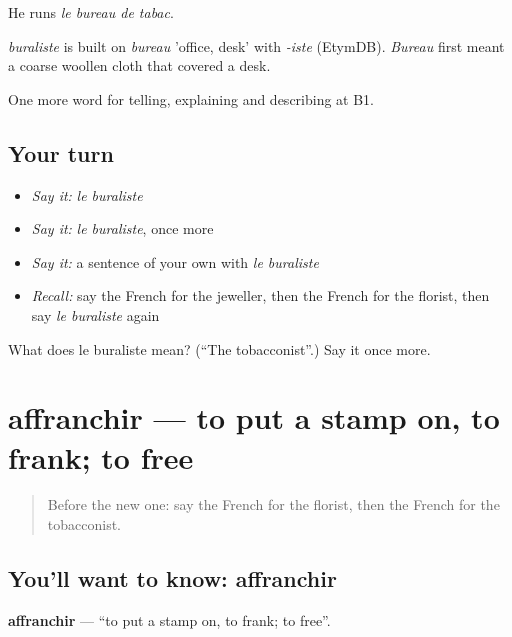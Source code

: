 He runs \emph{le bureau de tabac}.

\begin{cousinweb}
\emph{buraliste} is built on \emph{bureau} 'office, desk' with \emph{-iste} (EtymDB). \emph{Bureau} first meant a coarse woollen cloth that covered a desk.
\end{cousinweb}

\begin{grammarlens}[title={What you've built}]
One more word for telling, explaining and describing at B1.
\end{grammarlens}

\subsection*{Your turn}
\begin{itemize}
\raggedright
  \item \emph{Say it:} \emph{le buraliste}
  \item \emph{Say it:} \emph{le buraliste}, once more
  \item \emph{Say it:} a sentence of your own with \emph{le buraliste}
  \item \emph{Recall:} say the French for the jeweller, then the French for the florist, then say \emph{le buraliste} again
\end{itemize}

\begin{tcolorbox}[breakable,colback=teal!4,colframe=teal!35!black,title={Before you move on}]
What does le buraliste mean? (\textquotedblleft{}The tobacconist\textquotedblright{}.) Say it once more.
\end{tcolorbox}
\section[affranchir]{affranchir — to put a stamp on, to frank; to free}

\label{lesson:FR-C449-affranchir}



\begin{quote}
Before the new one: say the French for the florist, then the French for the tobacconist.
\end{quote}

\subsection*{You'll want to know: affranchir}
\textbf{affranchir} — \textquotedblleft{}to put a stamp on, to frank; to free\textquotedblright{}.

